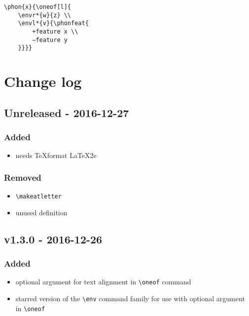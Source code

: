\documentclass[a4paper]{article}
\begin{document}
\begin{exe}
\ex
\begin{lstlisting}
\phon{x}{\oneof[l]{
    \envr*{w}{z} \\
    \envl*{v}{\phonfeat{
        +feature x \\
        −feature y
    }}}}
\end{lstlisting}
\ex {}
\end{exe}

\section{Change log}

\subsection*{Unreleased - 2016-12-27}
\subsubsection*{Added}
\begin{itemize}
    \item needs \TeX format \LaTeX2e
\end{itemize}
\subsubsection*{Removed}
\begin{itemize}
    \item \verb+\makeatletter+
    \item unused definition
\end{itemize}

\subsection*{v1.3.0 - 2016-12-26}
\subsubsection*{Added}
\begin{itemize}
    \item optional argument for text alignment in \verb+\oneof+ command
    \item starred version of the \verb+\env+ command family for use with optional argument in \verb+\oneof+
\end{itemize}
\end{document}
